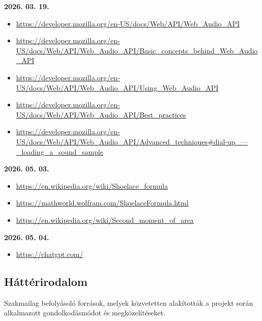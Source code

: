 \documentclass[12pt]{report}
\begin{document}
\noindent\textbf{2026. 03. 19.}
\begin{itemize}[left=0pt, topsep=0pt]
    \item \url{https://developer.mozilla.org/en-US/docs/Web/API/Web_Audio_API}
    \item \url{https://developer.mozilla.org/en-US/docs/Web/API/Web_Audio_API/Basic_concepts_behind_Web_Audio_API}
    \item \url{https://developer.mozilla.org/en-US/docs/Web/API/Web_Audio_API/Using_Web_Audio_API}
    \item \url{https://developer.mozilla.org/en-US/docs/Web/API/Web_Audio_API/Best_practices}
    \item \url{https://developer.mozilla.org/en-US/docs/Web/API/Web_Audio_API/Advanced_techniques#dial-up_—_loading_a_sound_sample}
\end{itemize}

\noindent\textbf{2026. 05. 03.}
\begin{itemize}[left=0pt, topsep=0pt]
    \item \url{https://en.wikipedia.org/wiki/Shoelace_formula}
    \item \url{https://mathworld.wolfram.com/ShoelaceFormula.html}
    \item \url{https://en.wikipedia.org/wiki/Second_moment_of_area}
\end{itemize}

\noindent\textbf{2026. 05. 04.}
\begin{itemize}[left=0pt, topsep=0pt]
    \item \url{https://chatgpt.com/}
\end{itemize}

\subsection*{Háttérirodalom}
Szakmailag befolyásoló források, melyek közvetetten alakították a projekt során alkalmazott gondolkodásmódot és megközelítéseket.
\bigskip
\end{document}
